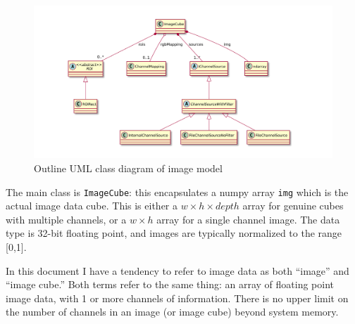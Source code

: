 \begin{figure}[ht]
\center
\includegraphics[width=6in]{image.pdf}
\caption{Outline UML class diagram of image model}
\label{image.pdf}
\end{figure}

The main class is \texttt{ImageCube}: this encapsulates a numpy array
\texttt{img}
which is the actual image data cube. This is either a 
$w \times h \times depth$ array for genuine cubes with multiple channels,
or a $w \times h$ array for a single channel image. The data type is 32-bit floating
point, and images are typically normalized to the range [0,1].

\begin{notebox}
In this document I have a tendency to refer to image data as both ``image'' and ``image cube.''
Both terms refer to the same thing: an array of floating point image data, with 1 or more channels
of information. There is no upper limit on the number of channels in an image (or image cube)
beyond system memory.
\end{notebox}


